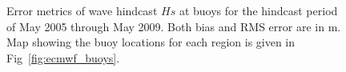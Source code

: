 \documentclass[12pt]{article}
\begin{document}
\begin{figure}[t]
\caption{Error metrics of wave hindcast $Hs$ at buoys for the hindcast period of May 2005 through May 2009. Both bias and RMS error are in m. Map showing the buoy locations for each region is given in Fig~\ref{fig:ecmwf_buoys}.}
\label{fig:ecmwf_buoys_err}
\end{figure}
\end{document}
